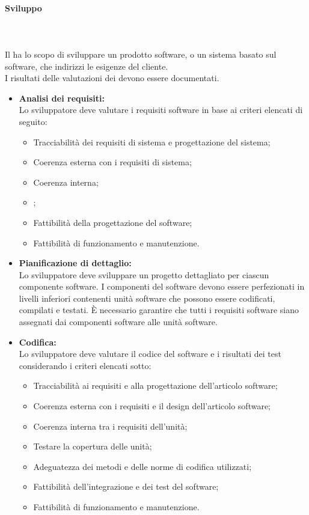 \paragraph{Sviluppo}\mbox{}\\ \\
Il  ha lo scopo di sviluppare un prodotto software, o un sistema basato sul software, che indirizzi le esigenze del cliente. \\
I risultati delle valutazioni dei  devono essere documentati.
\begin{itemize}
    \item \textbf{Analisi dei requisiti:} \\
    Lo sviluppatore deve valutare i requisiti software in base ai criteri elencati di seguito:
        \begin{itemize}
            \item Tracciabilità dei requisiti di sistema e progettazione del sistema;
            \item Coerenza esterna con i requisiti di sistema;
            \item Coerenza interna;
            \item {};
            \item Fattibilità della progettazione del software;
            \item Fattibilità di funzionamento e manutenzione.
        \end{itemize}
    \item \textbf{Pianificazione di dettaglio:} \\
    Lo sviluppatore deve sviluppare un progetto dettagliato per ciascun componente software. I componenti del software 
    devono essere perfezionati in livelli inferiori contenenti unità software che possono essere codificati, compilati 
    e testati. È necessario garantire che tutti i requisiti software siano assegnati dai componenti software 
    alle unità software.
    
    \item \textbf{Codifica:} \\
    Lo sviluppatore deve valutare il codice del software e i risultati dei test considerando i criteri elencati sotto:
    \begin{itemize}
        \item Tracciabilità ai requisiti e alla progettazione dell'articolo software;
        \item Coerenza esterna con i requisiti e il design dell'articolo software;
        \item Coerenza interna tra i requisiti dell'unità;
        \item Testare la copertura delle unità;
        \item Adeguatezza dei metodi e delle norme di codifica utilizzati;
        \item Fattibilità dell'integrazione e dei test del software;
        \item Fattibilità di funzionamento e manutenzione.   
    \end{itemize}
\end{itemize}

